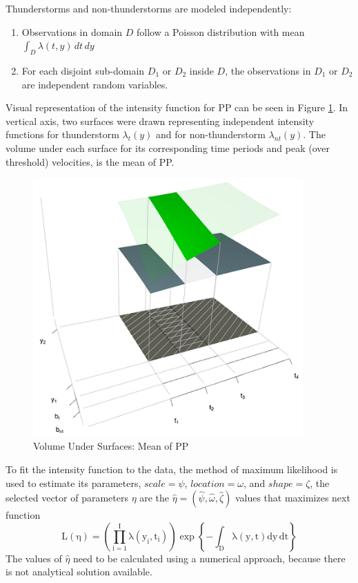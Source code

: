 \documentclass[12pt,oneside]{reedthesis}
\providecommand{\tightlist}{%
  \setlength{\itemsep}{0pt}\setlength{\parskip}{0pt}}
\begin{document}
Thunderstorms and non-thunderstorms are modeled independently:
\begin{enumerate}
\def\labelenumi{\arabic{enumi}.}
\tightlist
\item
  Observations in domain \(D\) follow a Poisson distribution with mean \(\int_D\lambda(t,y)\,dt\,dy\)
\item
  For each disjoint sub-domain \(D_1\) or \(D_2\) inside \(D\), the observations in \(D_1\) or \(D_2\) are independent random variables.
\end{enumerate}
Visual representation of the intensity function for PP can be seen in Figure \ref{fig:plotdomain3dpp}. In vertical axis, two surfaces were drawn representing independent intensity functions for thunderstorm \(\lambda_t(y)\) and for non-thunderstorm \(\lambda_{nt}(y)\). The volume under each surface for its corresponding time periods and peak (over threshold) velocities, is the mean of PP.
\begin{figure}

{\centering \includegraphics[width=4.07in]{figure/domain3d} 

}

\caption{Volume Under Surfaces: Mean of PP}\label{fig:plotdomain3dpp}
\end{figure}
To fit the intensity function to the data, the method of maximum likelihood is used to estimate its parameters, \(scale = \psi\), \(location = \omega\), and \(shape = \zeta\), the selected vector of parameters \(\eta\) are the \(\hat\eta = (\hat\psi, \hat\omega, \hat\zeta)\) values that maximizes next function
\begin{equation}
  \mathrm{
          L(\eta)=\left( 
                        \prod_{i=1}^I\lambda\left(y_i,t_i\right)  
                  \right)
                  \exp\left\{
                            -\int_{{D}}\lambda\left(y,t\right)dy\,dt
                     \right\}
         }
  \label{eq:pplikelihood}
\end{equation}
The values of \(\hat\eta\) need to be calculated using a numerical approach, because there is not analytical solution available.
\end{document}
